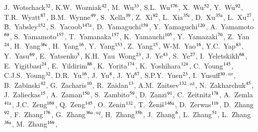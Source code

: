 \begin{flushleft}
J.~Wotschack$^\textrm{\scriptsize 32}$,
K.W.~Wozniak$^\textrm{\scriptsize 42}$,
M.~Wu$^\textrm{\scriptsize 33}$,
S.L.~Wu$^\textrm{\scriptsize 176}$,
X.~Wu$^\textrm{\scriptsize 52}$,
Y.~Wu$^\textrm{\scriptsize 92}$,
T.R.~Wyatt$^\textrm{\scriptsize 87}$,
B.M.~Wynne$^\textrm{\scriptsize 49}$,
S.~Xella$^\textrm{\scriptsize 39}$,
Z.~Xi$^\textrm{\scriptsize 92}$,
L.~Xia$^\textrm{\scriptsize 35c}$,
D.~Xu$^\textrm{\scriptsize 35a}$,
L.~Xu$^\textrm{\scriptsize 27}$,
B.~Yabsley$^\textrm{\scriptsize 152}$,
S.~Yacoob$^\textrm{\scriptsize 147a}$,
D.~Yamaguchi$^\textrm{\scriptsize 159}$,
Y.~Yamaguchi$^\textrm{\scriptsize 120}$,
A.~Yamamoto$^\textrm{\scriptsize 69}$,
S.~Yamamoto$^\textrm{\scriptsize 157}$,
T.~Yamanaka$^\textrm{\scriptsize 157}$,
K.~Yamauchi$^\textrm{\scriptsize 105}$,
Y.~Yamazaki$^\textrm{\scriptsize 70}$,
Z.~Yan$^\textrm{\scriptsize 24}$,
H.~Yang$^\textrm{\scriptsize 36c}$,
H.~Yang$^\textrm{\scriptsize 16}$,
Y.~Yang$^\textrm{\scriptsize 153}$,
Z.~Yang$^\textrm{\scriptsize 15}$,
W-M.~Yao$^\textrm{\scriptsize 16}$,
Y.C.~Yap$^\textrm{\scriptsize 83}$,
Y.~Yasu$^\textrm{\scriptsize 69}$,
E.~Yatsenko$^\textrm{\scriptsize 5}$,
K.H.~Yau~Wong$^\textrm{\scriptsize 23}$,
J.~Ye$^\textrm{\scriptsize 43}$,
S.~Ye$^\textrm{\scriptsize 27}$,
I.~Yeletskikh$^\textrm{\scriptsize 68}$,
E.~Yigitbasi$^\textrm{\scriptsize 24}$,
E.~Yildirim$^\textrm{\scriptsize 86}$,
K.~Yorita$^\textrm{\scriptsize 174}$,
K.~Yoshihara$^\textrm{\scriptsize 124}$,
C.~Young$^\textrm{\scriptsize 145}$,
C.J.S.~Young$^\textrm{\scriptsize 32}$,
D.R.~Yu$^\textrm{\scriptsize 16}$,
J.~Yu$^\textrm{\scriptsize 8}$,
J.~Yu$^\textrm{\scriptsize 67}$,
S.P.Y.~Yuen$^\textrm{\scriptsize 23}$,
I.~Yusuff$^\textrm{\scriptsize 30}$$^{,ax}$,
B.~Zabinski$^\textrm{\scriptsize 42}$,
G.~Zacharis$^\textrm{\scriptsize 10}$,
R.~Zaidan$^\textrm{\scriptsize 13}$,
A.M.~Zaitsev$^\textrm{\scriptsize 132}$$^{,ak}$,
N.~Zakharchuk$^\textrm{\scriptsize 45}$,
J.~Zalieckas$^\textrm{\scriptsize 15}$,
A.~Zaman$^\textrm{\scriptsize 150}$,
S.~Zambito$^\textrm{\scriptsize 59}$,
D.~Zanzi$^\textrm{\scriptsize 91}$,
C.~Zeitnitz$^\textrm{\scriptsize 178}$,
A.~Zemla$^\textrm{\scriptsize 41a}$,
J.C.~Zeng$^\textrm{\scriptsize 169}$,
Q.~Zeng$^\textrm{\scriptsize 145}$,
O.~Zenin$^\textrm{\scriptsize 132}$,
T.~\v{Z}eni\v{s}$^\textrm{\scriptsize 146a}$,
D.~Zerwas$^\textrm{\scriptsize 119}$,
D.~Zhang$^\textrm{\scriptsize 92}$,
F.~Zhang$^\textrm{\scriptsize 176}$,
G.~Zhang$^\textrm{\scriptsize 36a}$$^{,aq}$,
H.~Zhang$^\textrm{\scriptsize 35b}$,
J.~Zhang$^\textrm{\scriptsize 6}$,
L.~Zhang$^\textrm{\scriptsize 51}$,
L.~Zhang$^\textrm{\scriptsize 36a}$,
M.~Zhang$^\textrm{\scriptsize 169}$,
$$
\end{flushleft}
